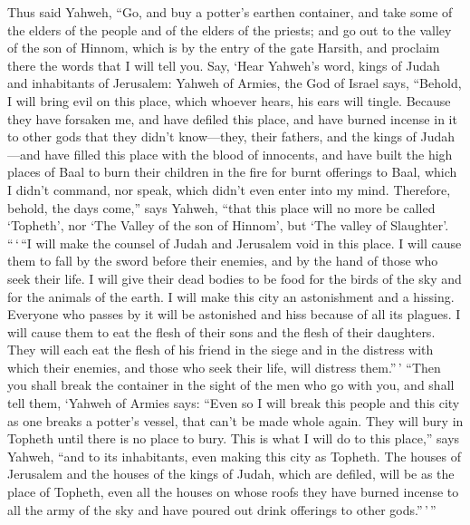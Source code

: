 \begin{paracol}{2}
\begin{otherlanguage}{english}
 Thus said Yahweh, ``Go, and buy a potter's earthen
container, and take some of the elders of the people and of the elders
of the priests;  and go out to the valley of the son of
Hinnom, which is by the entry of the gate Harsith, and proclaim there
the words that I will tell you.  Say, `Hear Yahweh's word,
kings of Judah and inhabitants of Jerusalem: Yahweh of Armies, the God
of Israel says, ``Behold, I will bring evil on this place, which whoever
hears, his ears will tingle.  Because they have forsaken
me, and have defiled this place, and have burned incense in it to other
gods that they didn't know---they, their fathers, and the kings of
Judah---and have filled this place with the blood of innocents,
 and have built the high places of Baal to burn their
children in the fire for burnt offerings to Baal, which I didn't
command, nor speak, which didn't even enter into my mind. 
Therefore, behold, the days come,'' says Yahweh, ``that this place will
no more be called `Topheth', nor `The Valley of the son of Hinnom', but
`The valley of Slaughter'.  ``\,`\,``I will make the
counsel of Judah and Jerusalem void in this place. I will cause them to
fall by the sword before their enemies, and by the hand of those who
seek their life. I will give their dead bodies to be food for the birds
of the sky and for the animals of the earth.  I will make
this city an astonishment and a hissing. Everyone who passes by it will
be astonished and hiss because of all its plagues.  I will
cause them to eat the flesh of their sons and the flesh of their
daughters. They will each eat the flesh of his friend in the siege and
in the distress with which their enemies, and those who seek their life,
will distress them.''\,'  ``Then you shall break the
container in the sight of the men who go with you,  and
shall tell them, `Yahweh of Armies says: ``Even so I will break this
people and this city as one breaks a potter's vessel, that can't be made
whole again. They will bury in Topheth until there is no place to bury.
 This is what I will do to this place,'' says Yahweh,
``and to its inhabitants, even making this city as Topheth.
 The houses of Jerusalem and the houses of the kings of
Judah, which are defiled, will be as the place of Topheth, even all the
houses on whose roofs they have burned incense to all the army of the
sky and have poured out drink offerings to other gods.''\,'\,''


\end{otherlanguage}
\end{paracol}
